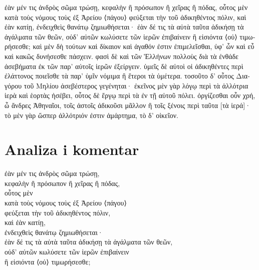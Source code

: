 {\large

\begin{greek}

\noindent ἐὰν μέν τις ἀνδρὸς σῶμα τρώσῃ, κεφαλὴν ἢ πρόσωπον ἢ χεῖρας ἢ πόδας, οὗτος μὲν κατὰ τοὺς νόμους τοὺς ἐξ Ἀρείου ⟨πάγου⟩ φεύξεται τὴν τοῦ ἀδικηθέντος πόλιν, καὶ ἐὰν κατίῃ, ἐνδειχθεὶς θανάτῳ ζημιωθήσεται· ἐὰν δέ τις τὰ αὐτὰ ταῦτα ἀδικήσῃ τὰ ἀγάλματα τῶν θεῶν, οὐδ' αὐτῶν κωλύσετε τῶν ἱερῶν ἐπιβαίνειν ἢ εἰσιόντα ⟨οὐ⟩ τιμωρήσεσθε; καὶ μὲν δὴ τούτων καὶ δίκαιον καὶ ἀγαθόν ἐστιν ἐπιμελεῖσθαι, ὑφ' ὧν καὶ εὖ καὶ κακῶς δυνήσεσθε πάσχειν. φασὶ δὲ καὶ τῶν Ἑλλήνων πολλοὺς διὰ τὰ ἐνθάδε ἀσεβήματα ἐκ τῶν παρ' αὐτοῖς ἱερῶν ἐξείργειν. ὑμεῖς δὲ αὐτοὶ οἱ ἀδικηθέντες περὶ ἐλάττονος ποιεῖσθε τὰ παρ' ὑμῖν νόμιμα ἢ ἕτεροι τὰ ὑμέτερα. τοσοῦτο δ' οὗτος Διαγόρου τοῦ Μηλίου ἀσεβέστερος γεγένηται· ἐκεῖνος μὲν γὰρ λόγῳ περὶ τὰ ἀλλότρια ἱερὰ καὶ ἑορτὰς ἠσέβει, οὗτος δὲ ἔργῳ περὶ τὰ ἐν τῇ αὑτοῦ πόλει. ὀργίζεσθαι οὖν χρή, ὦ ἄνδρες Ἀθηναῖοι, τοῖς ἀστοῖς ἀδικοῦσι μᾶλλον ἢ τοῖς ξένοις περὶ ταῦτα [τὰ ἱερά]· τὸ μὲν γὰρ ὥσπερ ἀλλότριόν ἐστιν ἁμάρτημα, τὸ δ' οἰκεῖον.

\end{greek}

}

\newpage

\section*{Analiza i komentar}


{\large
  
\begin{greek}
\noindent ἐὰν μέν τις ἀνδρὸς σῶμα τρώσῃ,\\
\tabto{2em} κεφαλὴν ἢ πρόσωπον ἢ χεῖρας ἢ πόδας,\\ 
οὗτος μὲν\\
\tabto{2em} κατὰ τοὺς νόμους τοὺς ἐξ Ἀρείου ⟨πάγου⟩\\
φεύξεται τὴν τοῦ ἀδικηθέντος πόλιν,\\
καὶ ἐὰν κατίῃ,\\
ἐνδειχθεὶς θανάτῳ ζημιωθήσεται·\\
ἐὰν δέ τις τὰ αὐτὰ ταῦτα ἀδικήσῃ τὰ ἀγάλματα τῶν θεῶν, \\
οὐδ' αὐτῶν κωλύσετε τῶν ἱερῶν ἐπιβαίνειν \\
ἢ εἰσιόντα ⟨οὐ⟩ τιμωρήσεσθε;\\

\end{greek}
}

